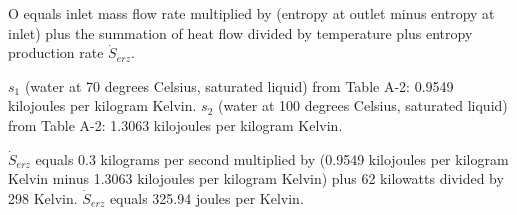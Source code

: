 O equals inlet mass flow rate multiplied by (entropy at outlet minus entropy at inlet) plus the summation of heat flow divided by temperature plus entropy production rate \( \dot{S}_{erz} \).  

\( s_1 \) (water at 70 degrees Celsius, saturated liquid) from Table A-2: 0.9549 kilojoules per kilogram Kelvin.  
\( s_2 \) (water at 100 degrees Celsius, saturated liquid) from Table A-2: 1.3063 kilojoules per kilogram Kelvin.  

\( \dot{S}_{erz} \) equals 0.3 kilograms per second multiplied by (0.9549 kilojoules per kilogram Kelvin minus 1.3063 kilojoules per kilogram Kelvin) plus 62 kilowatts divided by 298 Kelvin.  
\( \dot{S}_{erz} \) equals 325.94 joules per Kelvin.